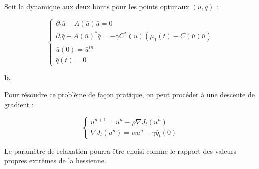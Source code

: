 \documentclass[a4paper]{article}
\begin{document}
Soit la dynamique aux deux bouts pour les points optimaux $(\bar{u},\bar{q})$ :

\[
\begin{cases}
	\partial_t \bar{u} - A(\bar{u})\bar{u} =0 \\
	\partial_t \bar{q} + A(\bar{u})^* \bar{q} = - \gamma C^*(u) (\mu_1(t) - C(\bar{u})\bar{u} ) \\
	\bar{u}(0) = \bar{u}^{in}\\
	\bar{q}(t) = 0
\end{cases}
\]

\textbf{b.}

Pour résoudre ce problème de façon pratique, on peut procéder à une descente de gradient :

\[
\begin{cases}
    u^{n+1} = u^n - \rho \nabla J_t (u^n) \\
	\nabla J_t(u^n) = \alpha u^n - \gamma \bar{q}_t(0)
\end{cases}
\]

Le paramètre de relaxation pourra être choisi comme le rapport des valeurs propres extrêmes de la hessienne.











	
\end{document}
